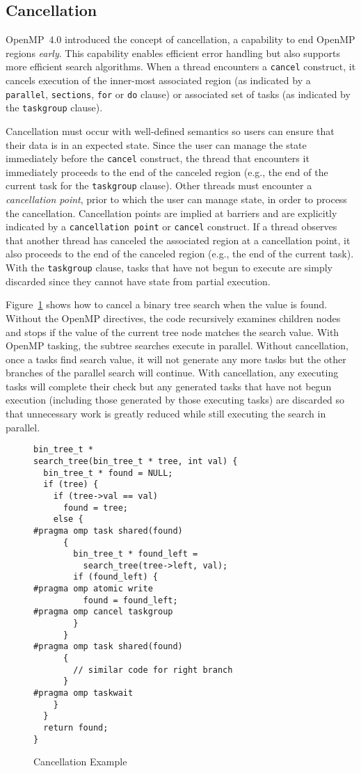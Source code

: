 \subsection{Cancellation}
\label{sec:Cancellation}
OpenMP~4.0 introduced the concept of cancellation, a capability to end 
OpenMP regions \emph{early}. This capability enables efficient error
handling but also supports more efficient search algorithms. When a thread
encounters a \texttt{cancel} construct, it cancels execution of the 
inner-most associated region (as indicated by a \texttt{parallel}, 
\texttt{sections}, \texttt{for} or \texttt{do} clause) or associated set 
of tasks (as indicated by the \texttt{taskgroup} clause). 

Cancellation must occur with well-defined semantics so users can ensure 
that their data is in an expected state. Since the user can manage the 
state immediately before the \texttt{cancel} construct, the thread 
that encounters it immediately proceeds to the end of the canceled region 
(e.g., the end of the current task for the \texttt{taskgroup} clause). Other
threads must encounter a \emph{cancellation point}, prior to which the user 
can manage state, in order to process the cancellation. Cancellation points 
are implied at barriers and are explicitly indicated by a 
\texttt{cancellation point} or \texttt{cancel} construct. If a thread observes 
that another thread has canceled the associated region at a cancellation point,
it also proceeds to the end of the canceled region (e.g., the end of the 
current task). With the \texttt{taskgroup} clause, tasks that have not begun
to execute are simply discarded since they cannot have state from partial 
execution.

Figure~\ref{fig:Cancellation} shows how to cancel a binary tree search when 
the value is found. Without the OpenMP directives, the code recursively 
examines children nodes and stops if the value of the current tree node 
matches the search value. With OpenMP tasking, the subtree searches execute
in parallel. Without cancellation, once a tasks find search value, it will 
not generate any more tasks but the other branches of the parallel search 
will continue. With cancellation, any executing tasks will complete their 
check but any generated tasks that have not begun execution (including those 
generated by those executing tasks) are discarded so that unnecessary work 
is greatly reduced while still executing the search in parallel.

\begin{figure}
\begin{verbatim}
bin_tree_t *
search_tree(bin_tree_t * tree, int val) {
  bin_tree_t * found = NULL;
  if (tree) {
    if (tree->val == val)
      found = tree;
    else {
#pragma omp task shared(found)
      {
        bin_tree_t * found_left =
          search_tree(tree->left, val);
        if (found_left) {
#pragma omp atomic write
          found = found_left;
#pragma omp cancel taskgroup
        }
      }
#pragma omp task shared(found)
      {
        // similar code for right branch
      }
#pragma omp taskwait
    }
  }
  return found;
}
\end{verbatim}
\caption{Cancellation Example\label{fig:Cancellation}}
\end{figure}


